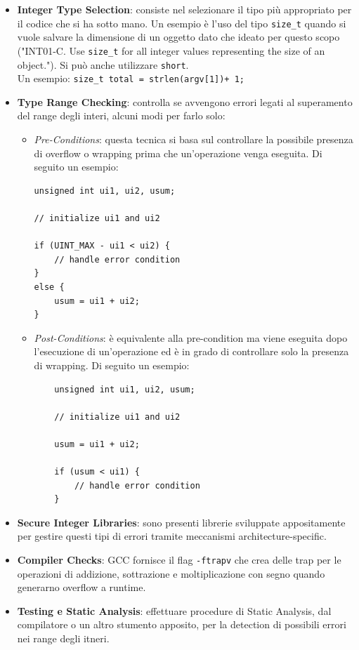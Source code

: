 \begin{itemize}
    \item \textbf{Integer Type Selection}:
          consiste nel selezionare il tipo più
          appropriato per il codice che si ha sotto mano.
          Un esempio è l'uso del tipo \verb|size_t| quando si vuole salvare la dimensione di un oggetto dato che ideato per questo scopo
          ("INT01-C. Use \verb|size_t| for all integer values representing the size of
          an object.").
          Si può anche utilizzare \verb|short|.\\
          Un esempio: \verb|size_t total = strlen(argv[1])+ 1;|
    \item \textbf{Type Range Checking}:
          controlla se avvengono errori legati al superamento del range degli interi,
          alcuni modi per farlo solo: \begin{itemize}
              \item \textit{Pre-Conditions}:
                    questa tecnica si basa sul controllare la possibile presenza di
                    overflow o wrapping prima che un'operazione venga eseguita.
                    Di seguito un esempio:
                    \begin{lstlisting}
unsigned int ui1, ui2, usum;

// initialize ui1 and ui2

if (UINT_MAX - ui1 < ui2) {
    // handle error condition
}
else {
    usum = ui1 + ui2;
}
                    \end{lstlisting}
              \item \textit{Post-Conditions}:
                    è equivalente alla pre-condition ma viene eseguita dopo
                    l'esecuzione di un'operazione ed è in grado di controllare solo la
                    presenza di wrapping. Di seguito un esempio:
                    \begin{lstlisting}
    unsigned int ui1, ui2, usum;

    // initialize ui1 and ui2

    usum = ui1 + ui2;

    if (usum < ui1) {
        // handle error condition
    }
                    \end{lstlisting}
          \end{itemize}
    \item \textbf{Secure Integer Libraries}:
          sono presenti librerie sviluppate appositamente per gestire questi
          tipi di errori tramite meccanismi architecture-specific.
    \item \textbf{Compiler Checks}:
          GCC fornisce il flag \verb|-ftrapv| che crea delle trap per le
          operazioni di addizione, sottrazione e moltiplicazione con segno
          quando generarno overflow a runtime.
    \item \textbf{Testing e Static Analysis}:
          effettuare procedure di Static Analysis,
          dal compilatore o un altro stumento apposito,
          per la detection di possibili errori nei range degli itneri.
\end{itemize}

